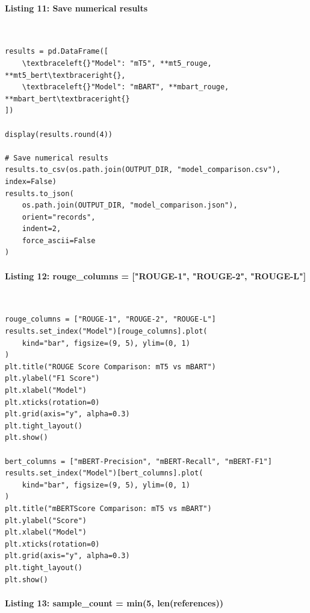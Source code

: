 \documentclass[12pt,a4paper,oneside]{report}
\begin{document}
\paragraph{Listing 11: Save numerical results}\mbox{}\\[-1ex]
\begin{Verbatim}[commandchars=\\\{\},breaklines=true,breakanywhere=true,fontsize=\scriptsize,frame=leftline,framesep=2mm,rulecolor=\color{gray}]
results = pd.DataFrame([
    \textbraceleft{}"Model": "mT5", **mt5_rouge, **mt5_bert\textbraceright{},
    \textbraceleft{}"Model": "mBART", **mbart_rouge, **mbart_bert\textbraceright{}
])

display(results.round(4))

# Save numerical results
results.to_csv(os.path.join(OUTPUT_DIR, "model_comparison.csv"), index=False)
results.to_json(
    os.path.join(OUTPUT_DIR, "model_comparison.json"),
    orient="records",
    indent=2,
    force_ascii=False
)
\end{Verbatim}
\paragraph{Listing 12: rouge\_columns = ["ROUGE-1", "ROUGE-2", "ROUGE-L"]}\mbox{}\\[-1ex]
\begin{Verbatim}[commandchars=\\\{\},breaklines=true,breakanywhere=true,fontsize=\scriptsize,frame=leftline,framesep=2mm,rulecolor=\color{gray}]
rouge_columns = ["ROUGE-1", "ROUGE-2", "ROUGE-L"]
results.set_index("Model")[rouge_columns].plot(
    kind="bar", figsize=(9, 5), ylim=(0, 1)
)
plt.title("ROUGE Score Comparison: mT5 vs mBART")
plt.ylabel("F1 Score")
plt.xlabel("Model")
plt.xticks(rotation=0)
plt.grid(axis="y", alpha=0.3)
plt.tight_layout()
plt.show()

bert_columns = ["mBERT-Precision", "mBERT-Recall", "mBERT-F1"]
results.set_index("Model")[bert_columns].plot(
    kind="bar", figsize=(9, 5), ylim=(0, 1)
)
plt.title("mBERTScore Comparison: mT5 vs mBART")
plt.ylabel("Score")
plt.xlabel("Model")
plt.xticks(rotation=0)
plt.grid(axis="y", alpha=0.3)
plt.tight_layout()
plt.show()
\end{Verbatim}
\paragraph{Listing 13: sample\_count = min(5, len(references))}\mbox{}\\[-1ex]
\end{document}
